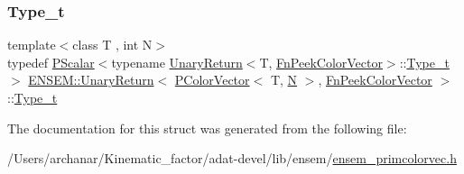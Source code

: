 \subsubsection{\texorpdfstring{Type\_t}{Type\_t}\hspace{0.1cm}{\footnotesize\ttfamily [3/3]}}
{\footnotesize\ttfamily template$<$class T , int N$>$ \\
typedef \mbox{\hyperlink{classENSEM_1_1PScalar}{P\+Scalar}}$<$typename \mbox{\hyperlink{structENSEM_1_1UnaryReturn}{Unary\+Return}}$<$T, \mbox{\hyperlink{structENSEM_1_1FnPeekColorVector}{Fn\+Peek\+Color\+Vector}}$>$\+::\mbox{\hyperlink{structENSEM_1_1UnaryReturn_3_01PColorVector_3_01T_00_01N_01_4_00_01FnPeekColorVector_01_4_a827d146f0d51b63a38339bc9218d64d4}{Type\+\_\+t}}$>$ \mbox{\hyperlink{structENSEM_1_1UnaryReturn}{E\+N\+S\+E\+M\+::\+Unary\+Return}}$<$ \mbox{\hyperlink{classENSEM_1_1PColorVector}{P\+Color\+Vector}}$<$ T, \mbox{\hyperlink{adat__devel_2lib_2hadron_2operator__name__util_8cc_a7722c8ecbb62d99aee7ce68b1752f337}{N}} $>$, \mbox{\hyperlink{structENSEM_1_1FnPeekColorVector}{Fn\+Peek\+Color\+Vector}} $>$\+::\mbox{\hyperlink{structENSEM_1_1UnaryReturn_3_01PColorVector_3_01T_00_01N_01_4_00_01FnPeekColorVector_01_4_a827d146f0d51b63a38339bc9218d64d4}{Type\+\_\+t}}}



The documentation for this struct was generated from the following file\+:\begin{DoxyCompactItemize}
\item 
/\+Users/archanar/\+Kinematic\+\_\+factor/adat-\/devel/lib/ensem/\mbox{\hyperlink{adat-devel_2lib_2ensem_2ensem__primcolorvec_8h}{ensem\+\_\+primcolorvec.\+h}}\end{DoxyCompactItemize}

